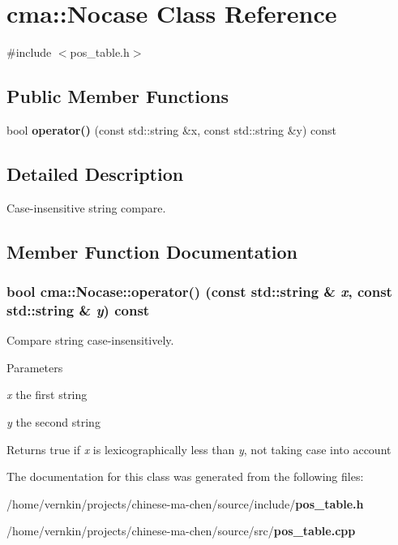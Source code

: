 \section{cma::Nocase Class Reference}
\label{classcma_1_1Nocase}


{\ttfamily \#include $<$pos\_\-table.h$>$}\subsection*{Public Member Functions}
\begin{DoxyCompactItemize}
\item 
bool {\bf operator()} (const std::string \&x, const std::string \&y) const 
\end{DoxyCompactItemize}


\subsection{Detailed Description}
Case-\/insensitive string compare. 

\subsection{Member Function Documentation}
\subsubsection[{operator()}]{\setlength{\rightskip}{0pt plus 5cm}bool cma::Nocase::operator() (const std::string \& {\em x}, \/  const std::string \& {\em y}) const}\label{classcma_1_1Nocase_a26ede1cd9f2d4ee5796af335019014e1}
Compare string case-\/insensitively. 
\begin{DoxyParams}{Parameters}
\item[{\em x}]the first string \item[{\em y}]the second string \end{DoxyParams}
\begin{DoxyReturn}{Returns}
true if {\itshape x\/} is lexicographically less than {\itshape y\/}, not taking case into account 
\end{DoxyReturn}


The documentation for this class was generated from the following files:\begin{DoxyCompactItemize}
\item 
/home/vernkin/projects/chinese-\/ma-\/chen/source/include/{\bf pos\_\-table.h}\item 
/home/vernkin/projects/chinese-\/ma-\/chen/source/src/{\bf pos\_\-table.cpp}\end{DoxyCompactItemize}
